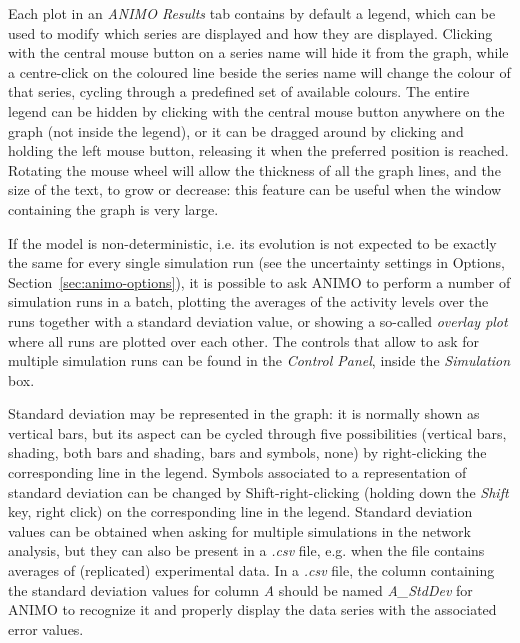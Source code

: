 \documentclass{article}
\begin{document}
Each plot in an \emph{ANIMO Results} tab contains by default a legend, which can be used to modify which series are
displayed and how they are displayed. Clicking with the central mouse button on a series name will hide it from the
graph, while a centre-click on the coloured line beside the series name will change the colour of that series,
cycling through a predefined set of available colours. The entire legend can be hidden by clicking with the
central mouse button anywhere on the graph (not inside the legend), or it can be dragged around by clicking and holding the left
mouse button, releasing it when the preferred position is reached. Rotating the mouse wheel will allow the thickness of all
the graph lines, and the size of the text, to grow or decrease: this feature can be useful when the window containing
the graph is very large.

If the model is non-deterministic, i.e. its
evolution is not expected to be exactly the same for every single simulation run (see the uncertainty settings in Options, Section~\ref{sec:animo-options}),
it is possible to ask ANIMO to perform
a number of simulation runs in a batch, plotting the averages of the activity levels over the runs together with a standard
deviation value, or showing a so-called \emph{overlay plot} where all runs are plotted over each other. The controls
that allow to ask for multiple simulation runs can be found in the \emph{Control Panel}, inside the \emph{Simulation} box.

Standard deviation may be represented in the graph: it is normally shown as vertical bars, but its aspect can be
cycled through five possibilities (vertical bars, shading, both bars and shading, bars and symbols, none) by right-clicking the
corresponding line in the legend. Symbols associated to a representation of standard deviation can be changed by Shift-right-clicking
(holding down the \emph{Shift} key, right click) on the corresponding line in the legend.
Standard deviation values can be obtained when asking for multiple simulations in the network
analysis, but they can also be present in a \emph{.csv} file, e.g. when the file contains averages of (replicated) experimental data.
In a \emph{.csv} file, the column containing the standard deviation values for column \emph{A}
should be named \emph{A\_{}StdDev} for ANIMO to recognize it and properly display the data series
with the associated error values.
\end{document}
